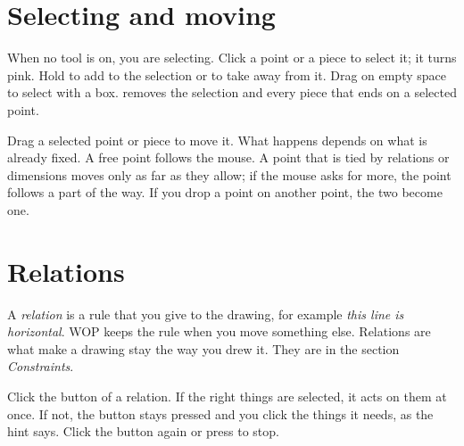 \section{Selecting and moving}\label{sec:sketch:select}

When no tool is on, you are selecting. Click a point or a piece to select it; it turns pink. Hold  to add to the selection or to take away from it. Drag on empty space to select with a box.  removes the selection and every piece that ends on a selected point.

Drag a selected point or piece to move it. What happens depends on what is already fixed. A free point follows the mouse. A point that is tied by relations or dimensions moves only as far as they allow; if the mouse asks for more, the point follows a part of the way. If you drop a point on another point, the two become one.

\section{Relations}\label{sec:sketch:relations}

A \emph{relation} is a rule that you give to the drawing, for example \emph{this line is horizontal}. WOP keeps the rule when you move something else. Relations are what make a drawing stay the way you drew it. They are in the section \emph{Constraints}.

Click the button of a relation. If the right things are selected, it acts on them at once. If not, the button stays pressed and you click the things it needs, as the hint says. Click the button again or press  to stop.


